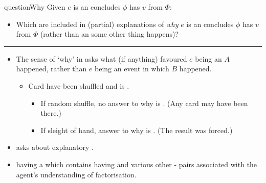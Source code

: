 \documentclass[10pt]{article}
\newcommand\lLine{{\color{lightgray} \noindent\rule{\textwidth}{0.4pt}}}
\newcommand{\hand}{\ding{43}}
\begin{document}
\begin{note}
  \begin{question}{questionWhy}{\qWhy{}}
    Given \(e\) is an  \vAgent{} concludes \prop{} \(\phi\) has \val{} \(v\) from \pool{} \(\Phi\):
    \begin{itemize}
    \item
      Which  are included in (partial) explanations of \emph{why} \(e\) is an  \vAgent{} concludes \prop{} \(\phi\) has \val{} \(v\) from \pool{} \(\Phi\) (rather than an  some other thing happens)?
    \end{itemize}
    \vspace{-1\baselineskip}
  \end{question}
\end{note}


\lLine


\begin{note}
  \begin{itemize}
  \item
    The sense of `why' in \qWhy{} asks what (if anything) favoured \(e\) being an \eiw{} \(A\) happened, rather than \(e\) being an event in which \(B\) happened.
    \begin{itemize}
    \item
      Card have been shuffled and \mainCard{} is \mainCardPos{}.
      \begin{itemize}
      \item
        If random shuffle, no answer to why \mainCard{} is \mainCardPos{}. \hfill (Any card may have been there.)
      \item
        If sleight of hand, answer to why \mainCard{} is \mainCardPos{}. \hfill (The result was forced.)
      \end{itemize}
    \end{itemize}
  \end{itemize}

  \begin{itemize}
  \item[\hand]
    \qWhy{} asks about explanatory .
  \item
    \propM{\rootsCon{}} having \val{}  \fof{} a \pool{} which contains \propM{\rootsConEq{}} having \val{}  and various other - pairs associated with the agent's understanding of factorisation.
  \end{itemize}

\end{note}
\end{document}
